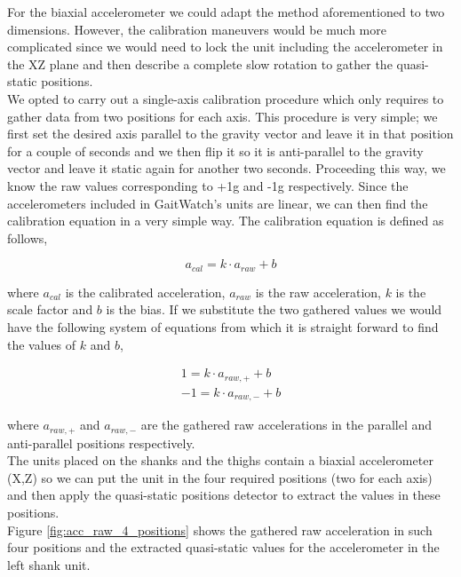 For the biaxial accelerometer we could adapt the method aforementioned to two dimensions. However, the calibration maneuvers would be much more complicated since we would need to lock the unit including the accelerometer in the XZ plane and then describe a complete slow rotation to gather the quasi-static positions. \\

\indent We opted to carry out a single-axis calibration procedure which only requires to gather data from two positions for each axis. This procedure is very simple; we first set the desired axis parallel to the gravity vector and leave it in that position for a couple of seconds and we then flip it so it is anti-parallel to the gravity vector and leave it static again for another two seconds. Proceeding this way, we know the raw values corresponding to +1g and -1g respectively. Since the accelerometers included in GaitWatch's units are linear, we can then find the calibration equation in a very simple way. The calibration equation is defined as follows,

\begin{equation}
\label{eq:acc_1D_cal_equation}
a_{cal} = k\cdot a_{raw} + b
\end{equation}

where $a_{cal}$ is the calibrated acceleration, $a_{raw}$ is the raw acceleration, $k$ is the scale factor and $b$ is the bias. If we substitute the two gathered values we would have the following system of equations from which it is straight forward to find the values of $k$ and $b$,

\begin{gather}
\label{eq:acc_1D_cal_system}
1 = k\cdot a_{raw,+} + b \\ \nonumber
-1 = k\cdot a_{raw,-} + b
\end{gather}

where $a_{raw,+}$ and $a_{raw,-}$ are the gathered raw accelerations in the parallel and anti-parallel positions respectively. \\

\indent The units placed on the shanks and the thighs contain a biaxial accelerometer (X,Z) so we can put the unit in the four required positions (two for each axis) and then apply the quasi-static positions detector to extract the values in these positions. \\

\indent Figure \ref{fig:acc_raw_4_positions} shows the gathered raw acceleration in such four positions and the extracted quasi-static values for the accelerometer in the left shank unit. 

